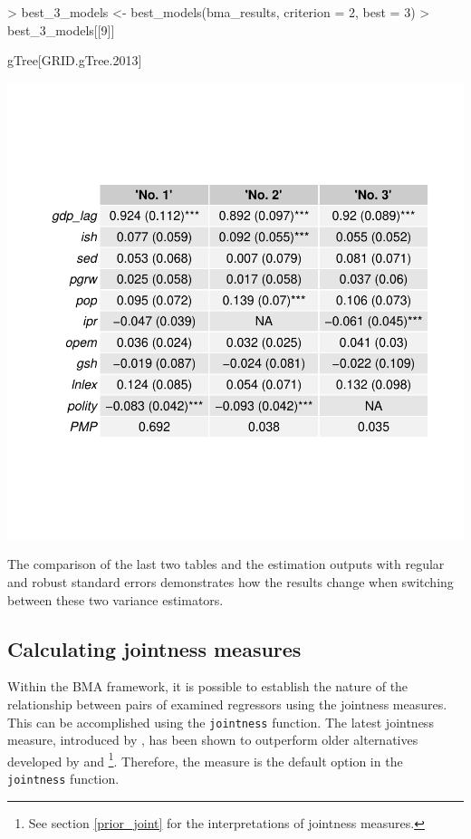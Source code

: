 \documentclass[a4paper]{article}
\begin{document}
\begin{Schunk}
\begin{Sinput}
> best_3_models <- best_models(bma_results, criterion = 2, best = 3)
> best_3_models[[9]]
\end{Sinput}
\begin{Soutput}
gTree[GRID.gTree.2013] 
\end{Soutput}
\end{Schunk}
\includegraphics{bdsm_vignette-019}

The comparison of the last two tables and the estimation outputs with regular and robust standard errors demonstrates
how the results change when switching between these two variance estimators.

\subsection{Calculating jointness measures}

Within the BMA framework, it is possible to establish the nature of the relationship between pairs of examined regressors using the jointness measures.
This can be accomplished using the \verb+jointness+ function.
The latest jointness measure, introduced by \citet{Hofmarcher+2018}, has been shown to outperform older alternatives developed by \citet{Ley+2007} and \citet{Doppelhofer+2009}\footnote{See section \ref{prior_joint} for the interpretations of jointness measures.}.
Therefore, the \citet{Hofmarcher+2018} measure is the default option in the \verb+jointness+ function.
\end{document}
